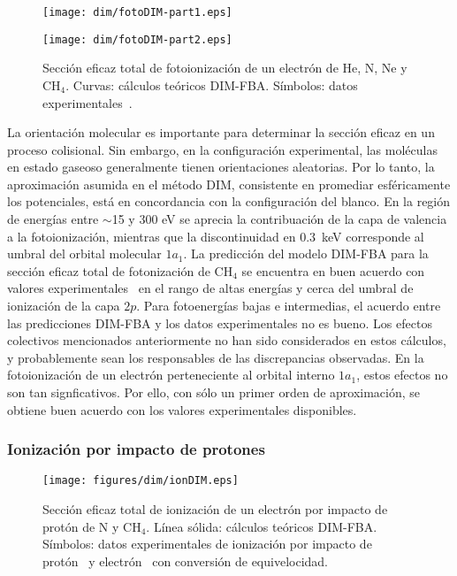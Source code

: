 \begin{figure}
\centering
\texttt{[image: dim/fotoDIM-part1.eps]} 

\vspace{-1.15cm}
\texttt{[image: dim/fotoDIM-part2.eps]}
\caption[Fotoionización de He, N, Ne y CH$_4$.]
{Sección eficaz total de fotoionización de un electrón de He, N, Ne y 
CH$_4$. Curvas: cálculos teóricos DIM-FBA. Símbolos: 
datos experimentales~\cite{Samson:90,Henke:93,Stolte:16,Samson:02,
Lukirskii:64,Henke:82,Samson:89}.}
\label{fig:photoDIM}
\end{figure}

La orientación molecular es importante para determinar la sección eficaz 
en un proceso colisional. Sin embargo, en la configuración experimental, 
las moléculas en estado gaseoso generalmente tienen orientaciones 
aleatorias. Por lo tanto, la aproximación asumida en el método DIM, 
consistente en promediar esféricamente los potenciales, está en 
concordancia con la configuración del blanco. En la región de energías 
entre $\sim$15 y 300 eV se aprecia la contribuación de la capa de 
valencia a la fotoionización, mientras que la discontinuidad en 
$0.3$~keV corresponde al umbral del orbital molecular $1a_1$. La 
predicción del modelo DIM-FBA para la sección eficaz total de 
fotonización de CH$_4$ se encuentra en buen acuerdo con valores 
experimentales~\cite{Lukirskii:64,Henke:82,Samson:89} en el rango de 
altas energías y cerca del umbral de ionización de la capa $2p$. Para 
fotoenergías bajas e intermedias, el acuerdo entre las predicciones 
DIM-FBA y los datos experimentales no es bueno. Los efectos colectivos 
mencionados anteriormente no han sido considerados en estos cálculos, y 
probablemente sean los responsables de las discrepancias observadas. En 
la fotoionización de un electrón perteneciente al orbital interno 
$1a_1$, estos efectos no son tan signficativos. Por ello, con sólo un 
primer orden de aproximación, se obtiene buen acuerdo con los valores 
experimentales disponibles. 

\subsubsection{Ionización por impacto de protones}

\begin{figure}[t]
\centering
\texttt{[image: figures/dim/ionDIM.eps]}
\caption[Ionización por impacto de protón de N y CH$_4$.]
{Sección eficaz total de ionización de un electrón por impacto de protón 
de N y CH$_4$. Línea sólida: cálculos teóricos DIM-FBA. 
Símbolos: datos experimentales de ionización por impacto de 
protón~\cite{Rudd:83,Rudd:85} y electrón~\cite{Brook:78} con conversión 
de equivelocidad.}
\label{fig:iondim}
\end{figure}

